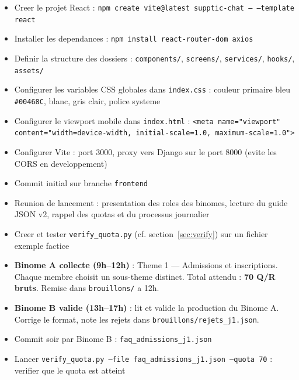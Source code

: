 \documentclass[11pt,a4paper]{article}
\begin{document}
\begin{reactbox}[Frontend --- J1]
\begin{itemize}
    \item[$\square$] Creer le projet React : \texttt{npm create vite@latest supptic-chat -- --template react}
    \item[$\square$] Installer les dependances : \texttt{npm install react-router-dom axios}
    \item[$\square$] Definir la structure des dossiers : \texttt{components/}, \texttt{screens/}, \texttt{services/}, \texttt{hooks/}, \texttt{assets/}
    \item[$\square$] Configurer les variables CSS globales dans \texttt{index.css} : couleur primaire bleu \texttt{\#00468C}, blanc, gris clair, police systeme
    \item[$\square$] Configurer le viewport mobile dans \texttt{index.html} : \texttt{<meta name="viewport" content="width=device-width, initial-scale=1.0, maximum-scale=1.0">}
    \item[$\square$] Configurer Vite : port 3000, proxy vers Django sur le port 8000 (evite les CORS en developpement)
    \item[$\square$] Commit initial sur branche \texttt{frontend}
\end{itemize}
\end{reactbox}

\begin{databox}[Data --- J1]
\begin{itemize}
    \item[$\square$] Reunion de lancement : presentation des roles des binomes, lecture du guide JSON v2, rappel des quotas et du processus journalier
    \item[$\square$] Creer et tester \texttt{verify\_quota.py} (cf. section~\ref{sec:verify}) sur un fichier exemple factice
    \item[$\square$] \textbf{Binome A collecte (9h--12h)} : Theme 1 --- Admissions et inscriptions. Chaque membre choisit un sous-theme distinct. Total attendu : \textbf{70 Q/R bruts}. Remise dans \texttt{brouillons/} a 12h.
    \item[$\square$] \textbf{Binome B valide (13h--17h)} : lit et valide la production du Binome A. Corrige le format, note les rejets dans \texttt{brouillons/rejets\_j1.json}.
    \item[$\square$] Commit soir par Binome B : \texttt{faq\_admissions\_j1.json}
    \item[$\square$] Lancer \texttt{verify\_quota.py --file faq\_admissions\_j1.json --quota 70} : verifier que le quota est atteint
\end{itemize}
\end{databox}
\end{document}
